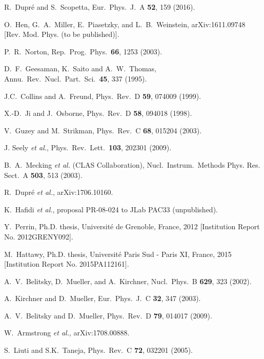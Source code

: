 \documentclass[twocolumn,nofootinbib,prl,superscriptaddress,secnumarabic,amssymb,nobibnotes,aps,floatfix]{revtex4}
\begin{document}
\begin{thebibliography}{99}
  R.~Dupr\'e and S.~Scopetta,
  Eur.\ Phys.\ J.\ A {\bf 52}, 159 (2016).

 O.~Hen, G.~A.~Miller, E.~Piasetzky, and L.~B.~Weinstein,
  arXiv:1611.09748 [Rev. Mod. Phys. (to be published)].

  P.~R.~Norton,
  Rep.\ Prog.\ Phys.\  {\bf 66}, 1253 (2003).

  D.~F.~Geesaman, K.~Saito and A.~W.~Thomas,
  Annu.\ Rev.\ Nucl.\ Part.\ Sci.\  {\bf 45}, 337 (1995).

J.C.~Collins and A.~Freund, 
Phys.\ Rev.\ D {\bf 59}, 074009 (1999).

X.-D.~Ji and J.~Osborne, 
Phys.\ Rev.\ D {\bf 58}, 094018 (1998).

  V.~Guzey and M.~Strikman,
  Phys.\ Rev.\ C {\bf 68}, 015204 (2003).

J. Seely {\it et al.}, Phys.\ Rev.\ Lett.\ {\bf 103}, 202301 (2009).

 B.~A.~Mecking {\it et al.} (CLAS Collaboration),
   Nucl.\ Instrum.\ Methods Phys. Res. Sect.\ A {\bf 503}, 513 (2003).

  R.~Dupr\'e {\it et al.},
  arXiv:1706.10160.

   K.~Hafidi {\it et al.},
   proposal PR-08-024 to JLab PAC33 (unpublished).

Y.~Perrin, Ph.D. thesis, Universit{\'e} de Grenoble, France, 2012
[Institution Report No. 2012GRENY092].

M.~Hattawy, Ph.D. thesis, Universit{\'e} Paris Sud - Paris XI, France, 2015 
[Institution Report No. 2015PA112161].

A.~V.~Belitsky, D.~Mueller, and A.~Kirchner,
Nucl.\ Phys.\ B {\bf 629}, 323 (2002).

A.~Kirchner and D.~Mueller, 
Eur.\ Phys.\ J.\ C {\bf 32}, 347 (2003).

A.~V.~Belitsky and D.~Mueller,
Phys.\ Rev.\ D {\bf 79}, 014017 (2009).

  W.~Armstrong {\it et al.},
  arXiv:1708.00888.

S.~Liuti and S.K.~Taneja, 
Phys.\ Rev.\ C {\bf 72}, 032201 (2005).


\end{thebibliography}
\end{document}
